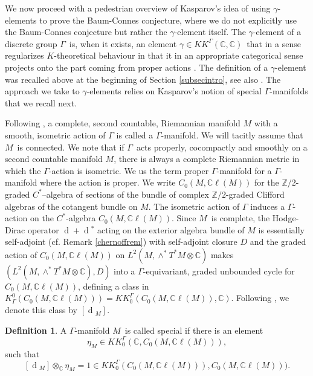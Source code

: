 \documentclass[a4paper,reqno]{amsart}
\numberwithin{equation}{section}
\def\rd{\operatorname{d}\!}
\def\C{\mathbb{C}}
\def\Z{\mathbb{Z}}
\theoremstyle{definition}
\newtheorem{definition}[thm]{Definition}
\theoremstyle{remark}
\begin{document}
We now proceed with a pedestrian overview of Kasparov's idea of using $\gamma$-elements to prove the Baum-Connes conjecture, where we do not explicitly use the Baum-Connes conjecture but rather the $\gamma$-element itself. The $\gamma$-element of a discrete group $\Gamma$ is, when it exists, an element $\gamma\in KK^\Gamma(\C,\C)$ that in a sense regularizes $K$-theoretical behaviour in that it in an appropriate categorical sense projects onto the part coming from proper actions \cite{meyernest}. The definition of a $\gamma$-element was recalled above at the beginning of Section \ref{subsecintro}, see also \cite{kaspinv,nishisplit,tu00}. The approach we take to $\gamma$-elements relies on Kasparov's notion of special $\Gamma$-manifolds \cite{kaspinv} that we recall next. 


Following \cite{kaspinv}, a complete, second countable, Riemannian manifold $M$ with a smooth, isometric action of $\Gamma$ is called a $\Gamma$-manifold. We will tacitly assume that $M$ is connected. We note that if $\Gamma$ acts properly, cocompactly and smoothly on a second countable manifold $M$, there is always a complete Riemannian metric in which the $\Gamma$-action is isometric. We us the term proper $\Gamma$-manifold for a $\Gamma$-manifold where the action is proper. We write $C_0(M,\C\ell(M))$ for the $\Z/2$-graded $C^*$–algebra of sections of the bundle of complex $\Z/2$-graded Clifford algebras of the cotangent bundle on $M$. The isometric action of $\Gamma$ induces a $\Gamma$-action on the $C^*$-algebra $C_0(M,\C\ell(M))$. Since $M$ is complete, the Hodge-Dirac operator $\rd+\rd^*$ acting on the exterior algebra bundle of $M$ is essentially self-adjoint (cf. Remark \ref{chernoffrem}) with self-adjoint closure $D$ and the graded action of $C_0(M,\C\ell(M))$ on $L^2(M,\wedge^*T^*M\otimes \C)$ makes $(L^2(M,\wedge^*T^*M\otimes \C), D)$ into a $\Gamma$-equivariant, graded unbounded cycle for  $C_0(M,\C\ell(M))$, defining a class in $K^0_\Gamma(C_0(M,\C\ell(M)))=KK_0^\Gamma(C_0(M,\C\ell(M)),\C)$. Following \cite{kaspinv}, we denote this class by $[\rd_M]$. 


\begin{definition}\label{special}
A $\Gamma$-manifold $M$ is called special if there is an element 
$$\eta_M\in KK_0^\Gamma(\C,C_0(M,\C\ell(M))),$$ 
such that 
$$[\rd_M]\otimes_\C\eta_M=1\in KK_0^\Gamma(C_0(M,\C\ell(M))),C_0(M,\C\ell(M))).$$
\end{definition}
\end{document}

